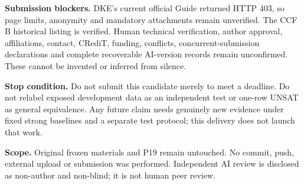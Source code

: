\documentclass[10pt]{article}
\begin{document}
\noindent\textbf{Submission blockers.} DKE's current official Guide returned HTTP 403, so page limits, anonymity and mandatory attachments remain unverified. The CCF B historical listing is verified. Human technical verification, author approval, affiliations, contact, CRediT, funding, conflicts, concurrent-submission declarations and complete recoverable AI-version records remain unconfirmed. These cannot be invented or inferred from silence.

\noindent\textbf{Stop condition.} Do not submit this candidate merely to meet a deadline. Do not relabel exposed development data as an independent test or one-row UNSAT as general equivalence. Any future claim needs genuinely new evidence under fixed strong baselines and a separate test protocol; this delivery does not launch that work.

\noindent\textbf{Scope.} Original frozen materials and P19 remain untouched. No commit, push, external upload or submission was performed. Independent AI review is disclosed as non-author and non-blind; it is not human peer review.
\end{document}
